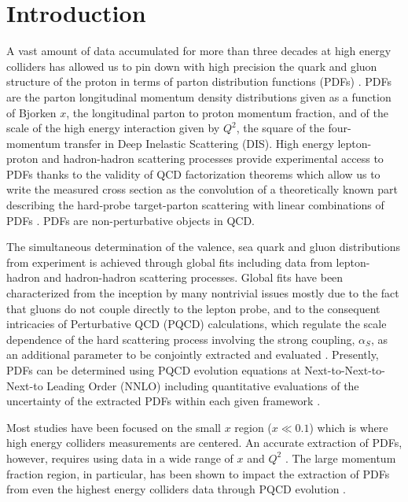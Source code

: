 \documentclass[
twocolumn,
aps,prd,
nofootinbib,
superscriptaddress,
showpacs,ligh
tightenlines, 
]{revtex4}
\begin{document}
\section{Introduction}
A vast amount of data accumulated for more than three decades at high energy colliders  has allowed us to pin down with high precision the quark and gluon structure of the proton in terms of parton distribution functions
(PDFs) \cite{Cooper-Sarkar:2015boa,Forte:2013wc,pdg}. PDFs are the parton longitudinal momentum density distributions given as a function of Bjorken $x$, the longitudinal parton to proton momentum fraction, and of the scale of the high energy interaction given by $Q^2$, the square of the four-momentum transfer in Deep Inelastic Scattering (DIS).
High energy lepton-proton and hadron-hadron scattering processes provide experimental access to PDFs thanks to the validity of QCD factorization theorems  which allow us to write the measured cross section as the convolution of 
a theoretically known part describing the hard-probe target-parton scattering with linear combinations of PDFs \cite{Collins:1989gx}. PDFs are non-perturbative objects in QCD. 

The simultaneous determination of the valence, sea quark and gluon distributions from experiment is achieved through global fits including data from lepton-hadron and hadron-hadron scattering processes. Global fits have been characterized  from the inception by many nontrivial issues mostly due to the fact that 
gluons do not couple directly to the lepton probe, 
and to the consequent intricacies of Perturbative QCD (PQCD) calculations, which regulate the scale dependence of the hard scattering process 
involving  the strong coupling, $\alpha_S$, as an additional parameter to be conjointly extracted and evaluated \cite{Bethke:2015etp}.
Presently, PDFs can be determined using PQCD evolution equations at Next-to-Next-to-Next-to Leading Order (NNLO) including 
quantitative evaluations of the uncertainty of the extracted PDFs within each given framework  \cite{pdg}.

Most studies have been focused on the small $x$ region ($x \ll 0.1$) which is where high energy colliders measurements are centered. An accurate extraction of PDFs, however, requires using data in a wide range of $x$ and $Q^2$ \cite{Accardi:2016qay,Accardi:2009br}.  The large momentum fraction region, in particular, has been shown to impact the extraction of PDFs from even the highest energy colliders data through PQCD evolution \cite{Sirunyan:2017azo}.  
\end{document}
